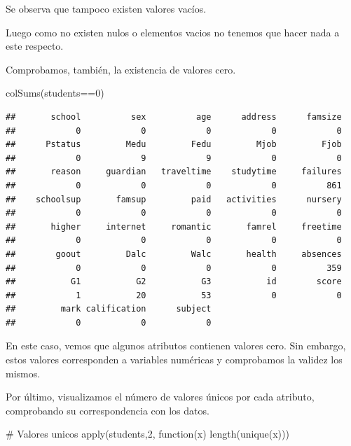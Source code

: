 \documentclass[]{article}
\newenvironment{Shaded}{\begin{snugshade}}{\end{snugshade}}
\newcommand{\CommentTok}[1]{\textcolor[rgb]{0.50,0.62,0.50}{#1}}
\newcommand{\ControlFlowTok}[1]{\textcolor[rgb]{0.94,0.87,0.69}{#1}}
\newcommand{\DecValTok}[1]{\textcolor[rgb]{0.86,0.86,0.80}{#1}}
\newcommand{\KeywordTok}[1]{\textcolor[rgb]{0.94,0.87,0.69}{#1}}
\newcommand{\NormalTok}[1]{\textcolor[rgb]{0.80,0.80,0.80}{#1}}
\newcommand{\OperatorTok}[1]{\textcolor[rgb]{0.94,0.94,0.82}{#1}}
\begin{document}
Se observa que tampoco existen valores vacíos.

Luego como no existen nulos o elementos vacios no tenemos que hacer nada
a este respecto.

Comprobamos, también, la existencia de valores cero.

\begin{Shaded}
\begin{Highlighting}[]
\KeywordTok{colSums}\NormalTok{(students}\OperatorTok{==}\DecValTok{0}\NormalTok{)}
\end{Highlighting}
\end{Shaded}

\begin{verbatim}
##       school          sex          age      address      famsize 
##            0            0            0            0            0 
##      Pstatus         Medu         Fedu         Mjob         Fjob 
##            0            9            9            0            0 
##       reason     guardian   traveltime    studytime     failures 
##            0            0            0            0          861 
##    schoolsup       famsup         paid   activities      nursery 
##            0            0            0            0            0 
##       higher     internet     romantic       famrel     freetime 
##            0            0            0            0            0 
##        goout         Dalc         Walc       health     absences 
##            0            0            0            0          359 
##           G1           G2           G3           id        score 
##            1           20           53            0            0 
##         mark calification      subject 
##            0            0            0
\end{verbatim}

En este caso, vemos que algunos atributos contienen valores cero. Sin
embargo, estos valores corresponden a variables numéricas y comprobamos
la validez los mismos.

Por último, visualizamos el número de valores únicos por cada atributo,
comprobando su correspondencia con los datos.

\begin{Shaded}
\begin{Highlighting}[]
\CommentTok{# Valores unicos}
\KeywordTok{apply}\NormalTok{(students,}\DecValTok{2}\NormalTok{, }\ControlFlowTok{function}\NormalTok{(x) }\KeywordTok{length}\NormalTok{(}\KeywordTok{unique}\NormalTok{(x)))}
\end{Highlighting}
\end{Shaded}
\end{document}
